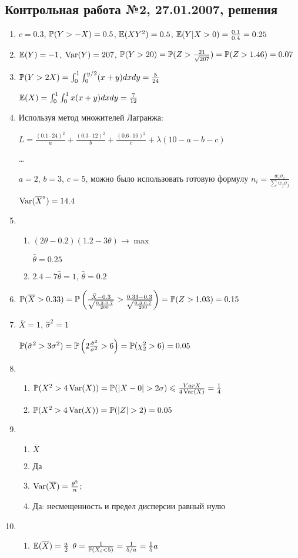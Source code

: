 \subsection{Контрольная работа №2, 27.01.2007, решения}

\begin{enumerate}
\item $c=0.3$, $\P(Y>-X)=0.5$, $\E(XY^{2})=0.5$, $\E(Y|X>0)=\frac{0.1}{0.4}=0.25$
\item $\E(Y)=-1$, $\Var(Y)=207$, $\P(Y>20)=\P(Z>\frac{21}{\sqrt{207}})=\P(Z>1.46)=0.07$
\item $\P(Y>2X)=\int_{0}^{1}\int_{0}^{y/2}(x+y)dxdy=\frac{5}{24}$

$\E(X)=\int_{0}^{1}\int_{0}^{1}x(x+y)dxdy=\frac{7}{12}$
\item Используя метод множителей Лагранжа:

$L=\frac{(0.1\cdot 24)^{2}}{a}+\frac{(0.3\cdot 12)^{2}}{b}+\frac{(0.6\cdot 10)^{2}}{c}+\lambda(10-a-b-c)$

\ldots

$a=2$, $b=3$, $c=5$, можно было использовать готовую формулу
$n_{i}=\frac{w_{i}\sigma_{i}}{\sum w_{j}\sigma_{j}}$

$\Var(\overline{X}^{s})=14.4$
\item
\begin{enumerate}
\item $(2\theta-0.2)(1.2-3\theta)\rightarrow\max$

$\hat{\theta}=0.25$
\item $2.4-7\hat{\theta}=1$, $\hat{\theta}=0.2$
\end{enumerate}
\item $\P(\overline{X}>0.33)=\P\left(\frac{\bar{X}-0.3}{\sqrt{\frac{0.3\cdot
0.7}{200}}}>\frac{0.33-0.3}{\sqrt{\frac{0.3\cdot
0.7}{200}}}\right)=\P(Z>1.03)=0.15$
\item $\bar{X}=1$, $\hat{\sigma}^{2}=1$

$\P(\hat{\sigma}^{2}>3\sigma^{2})=\P\left(2\frac{\hat{\sigma}^{2}}{\sigma^{2}}>6\right)=\P(\chi_{2}^{2}>6)=0.05$
\item
\begin{enumerate}
\item $\P(X^{2}>4\Var(X))=\P(|X-0|>2\sigma)\le
\frac{Var{X}}{4\Var(X)}=\frac{1}{4}$
\item $\P(X^{2}>4\Var(X))=\P(|Z|>2)=0.05$
\end{enumerate}
\item
\begin{enumerate}
\item $\overline{X}$
\item Да
\item $\Var(\overline{X})=\frac{\theta^{2}}{n}$;
\item Да: несмещенность и предел дисперсии равный нулю
\end{enumerate}
\item
\begin{enumerate}
\item $\E(\overline{X})=\frac{a}{2}$
$\theta=\frac{1}{\P(X_{i}<5)}=\frac{1}{5/a}=\frac{1}{5}a$


\end{enumerate}
\end{enumerate}
